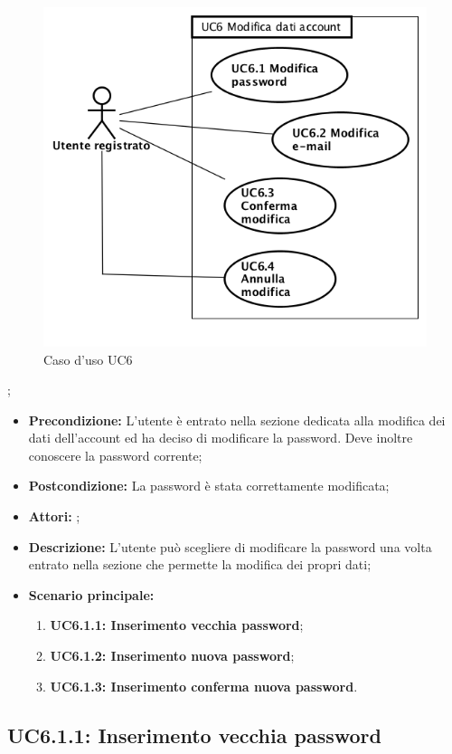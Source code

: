 \begin{figure}[h]
	\begin{center}
	\includegraphics[scale=0.4]{diagram/UC6.png}
	\caption{Caso d'uso UC6}
	\end{center}
\end{figure};
\begin{itemize}
	\item \textbf{Precondizione:} L’utente è entrato nella sezione dedicata alla modifica dei dati dell’account ed ha deciso di modificare la password. Deve inoltre conoscere la password corrente;
	\item \textbf{Postcondizione:} La password è stata correttamente modificata;
	\item \textbf{Attori:} ;
	\item \textbf{Descrizione:} L’utente può scegliere di modificare la password una volta entrato nella sezione che permette la modifica dei propri dati;
	\item \textbf{Scenario principale:}
	\begin{enumerate}
		\item \textbf{ UC6.1.1: Inserimento vecchia password};
		\item \textbf{ UC6.1.2: Inserimento nuova password};
		\item \textbf{ UC6.1.3: Inserimento conferma nuova password}.
	\end{enumerate}
\end{itemize}
\subsection{ UC6.1.1: Inserimento vecchia password}

